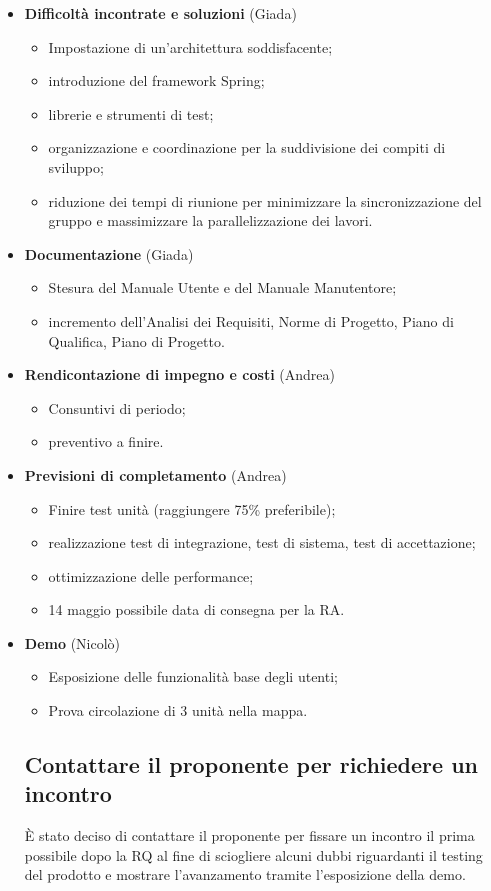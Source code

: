 \begin{itemize}
\begin{itemize}
		\item la resipiscenza: la nuova esposizione e il successo.
	\end{itemize}
	\item \textbf{Difficoltà incontrate e soluzioni} (Giada)
	\begin{itemize}
		\item Impostazione di un’architettura soddisfacente;
		\item introduzione del framework Spring;
		\item librerie e strumenti di test;
		\item organizzazione e coordinazione per la suddivisione dei compiti di sviluppo;
		\item riduzione dei tempi di riunione per minimizzare la sincronizzazione del gruppo e massimizzare la parallelizzazione dei lavori.
	\end{itemize}
	\item \textbf{Documentazione} (Giada)
	\begin{itemize}
		\item Stesura del Manuale Utente e del Manuale Manutentore;
		\item incremento dell'Analisi dei Requisiti, Norme di Progetto, Piano di Qualifica, Piano di Progetto.
	\end{itemize}
	\item \textbf{Rendicontazione di impegno e costi} (Andrea)
	\begin{itemize}
		\item Consuntivi di periodo;
		\item preventivo a finire.
	\end{itemize}
	\item \textbf{Previsioni di completamento} (Andrea)
	\begin{itemize}
		\item Finire test unità (raggiungere 75\% preferibile);
		\item realizzazione test di integrazione, test di sistema, test di accettazione;
		\item ottimizzazione delle performance;
		\item 14 maggio possibile data di consegna per la RA.
	\end{itemize}
	\item \textbf{Demo} (Nicolò)
	\begin{itemize}
		\item Esposizione delle funzionalità base degli utenti;
		\item Prova circolazione di 3 unità nella mappa.
	\end{itemize}

\subsection{Contattare il proponente per richiedere un incontro}

\`E stato deciso di contattare il proponente per fissare un incontro il prima possibile dopo la RQ al fine di sciogliere alcuni dubbi riguardanti il testing del prodotto e mostrare l'avanzamento tramite l'esposizione della demo.

\end{itemize}

